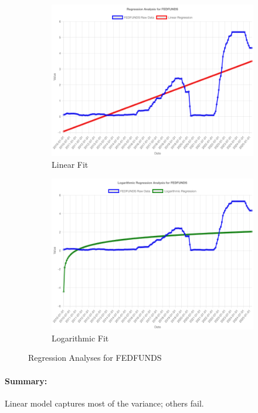 \documentclass[11pt,a4paper]{article}
\begin{document}
\begin{figure}[htbp]
  \centering
  \begin{subfigure}[b]{0.48\textwidth}
    \includegraphics[width=\textwidth]{backend/analyses/FEDFUNDS_analysis.png}
    \caption{Linear Fit}
  \end{subfigure}
  \hfill
  \begin{subfigure}[b]{0.48\textwidth}
    \includegraphics[width=\textwidth]{backend/analyses/FEDFUNDS_log_analysis.png}
    \caption{Logarithmic Fit}
  \end{subfigure}
  \caption{Regression Analyses for FEDFUNDS}
\end{figure}

\paragraph{Summary:}
Linear model captures most of the variance; others fail.
\end{document}
